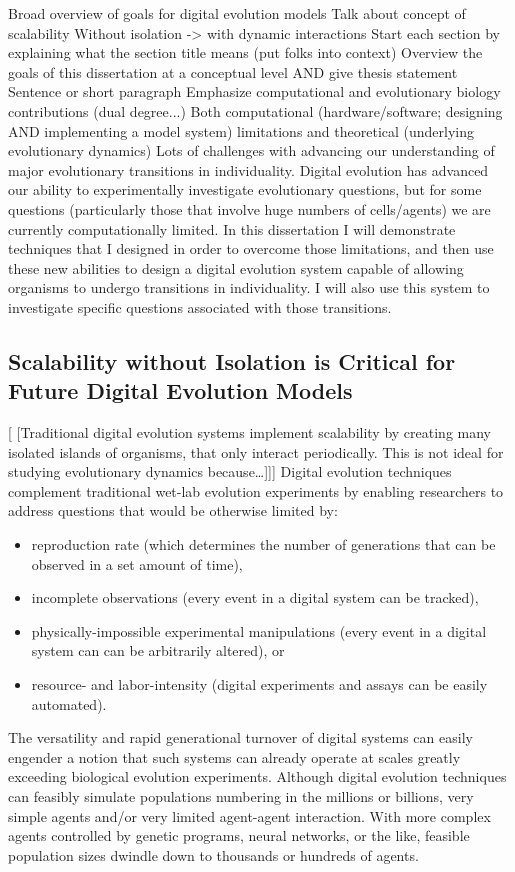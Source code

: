 Broad overview of goals for digital evolution models
Talk about concept of scalability
Without isolation -> with dynamic interactions
Start each section by explaining what the section title means (put folks into context)
Overview the goals of this dissertation at a conceptual level AND give thesis statement
Sentence or short paragraph
Emphasize computational and evolutionary biology contributions (dual degree...)
Both computational (hardware/software; designing AND implementing a model system) limitations and theoretical (underlying evolutionary dynamics)
Lots of challenges with advancing our understanding of major evolutionary transitions in individuality.
Digital evolution has advanced our ability to experimentally investigate evolutionary questions, but for some questions (particularly those that involve huge numbers of cells/agents) we are currently computationally limited.
In this dissertation I will demonstrate techniques that I designed in order to overcome those limitations, and then use these new abilities to design a digital evolution system capable of allowing organisms to undergo transitions in individuality.
I will also use this system to investigate specific questions associated with those transitions.

\subsection{Scalability without Isolation is Critical for Future Digital Evolution Models}
[
[Traditional digital evolution systems implement scalability by creating many isolated islands of organisms, that only interact periodically.
This is not ideal for studying evolutionary dynamics because…]]]
Digital evolution techniques complement traditional wet-lab evolution experiments by enabling researchers to address questions that would be otherwise limited by:
\begin{itemize}
\item reproduction rate (which determines the number of generations that can be observed in a set amount of time),
\item incomplete observations (every event in a digital system can be tracked),
\item physically-impossible experimental manipulations (every event in a digital system can can be arbitrarily altered), or
\item resource- and labor-intensity (digital experiments and assays can be easily automated).
\end{itemize}
The versatility and rapid generational turnover of digital systems can easily engender a notion that such systems can already operate at scales greatly exceeding biological evolution experiments.
Although digital evolution techniques can feasibly simulate populations numbering in the millions or billions, very simple agents and/or very limited agent-agent interaction.
With more complex agents controlled by genetic programs, neural networks, or the like, feasible population sizes dwindle down to thousands or hundreds of agents.


